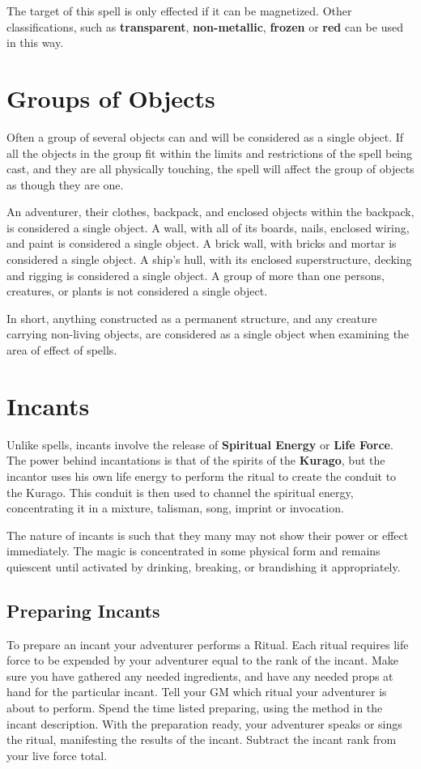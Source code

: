 \begin{multicols*}{2}
 The target of this spell is only effected if it can be magnetized. Other classifications, such as \textbf{transparent}, \textbf{non-metallic}, \textbf{frozen} or \textbf{red} can be used in this way.
\section{Groups of Objects}
Often a group of several objects can and will be considered as a single object. If all the objects in the group fit within the limits and restrictions of the spell being cast, and they are all physically touching, the spell will affect the group
of objects as though they are one. 

An adventurer, their clothes, backpack, and enclosed objects within the backpack, is considered a single object. A wall, with all of its boards, nails, enclosed wiring, and paint is considered a single object. A brick wall, with bricks and mortar is considered a single object. A ship's hull, with its enclosed superstructure, decking and rigging is considered a single object. A group of more than one persons, creatures, or plants is not considered a single object.

In short, anything constructed as a permanent structure, and any creature carrying non-living objects, are considered as a single object when examining the area of effect of spells.
\section{Incants}
Unlike spells, incants involve the release of \textbf{Spiritual Energy} or \textbf{Life Force}. The power behind incantations is that of the spirits of the \textbf{Kurago}, but the incantor uses his own life energy to perform the ritual to create the conduit to the Kurago. This conduit is then used to channel the spiritual energy, concentrating it in a mixture, talisman, song, imprint or invocation. 

The nature of incants is such that they many may not show their power or effect immediately. The magic is concentrated in some physical form and remains quiescent until activated by drinking, breaking, or brandishing it appropriately.
\subsection{Preparing Incants}
To prepare an incant your adventurer performs a Ritual. Each ritual requires life force to be expended by your adventurer equal to the rank of the incant. Make sure you have gathered any needed ingredients, and have any needed props at hand for the particular incant. Tell your GM which ritual your adventurer is about to perform. Spend the time listed preparing, using the method in the incant description. With the preparation ready, your adventurer speaks or sings the ritual, manifesting the results of the incant. Subtract the incant rank from your live force total.

\end{multicols*}

